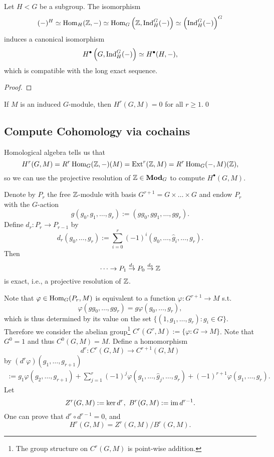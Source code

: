 \begin{proposition}\label{Shapiro's lemma}
Let $H < G$ be a subgroup.
The isomorphism\[(-)^H \simeq \operatorname{Hom}_H(\mathbb{Z}, -) \simeq \operatorname{Hom}_G\left(\mathbb{Z}, \operatorname{Ind}^G_H(-)\right)\simeq \left( \operatorname{Ind}_H^G(-) \right)^G\]induces a canonical isomorphism \[H^\bullet \left(G, \operatorname{Ind}^G_H (-)\right)\simeq H^\bullet (H, -),\]
which is compatible with the long exact sequence.
\end{proposition}
\begin{proof}
    
\end{proof}

\begin{corollary}\label{induced modules have trivial cohomology}
    If $M$ is an induced $G$-module, then $H^r(G, M) = 0$ for all $r\ge 1$.\qed
\end{corollary}


\subsection{Compute Cohomology via cochains}

Homological algebra tells us that \[H^r(G, M) = R^r\operatorname{Hom}_G(\mathbb{Z}, -)(M) = \operatorname{Ext}^r(\mathbb{Z}, M) = R^r\operatorname{Hom}_G(-, M)(\mathbb{Z}),\]
so we can use the projective resolution of $\mathbb{Z}\in\mathbf{Mod}_G$ to compute $H^\bullet(G, M)$.

Denote by $P_r$ the free $\mathbb{Z}$-module with basis $G^{r+1} = G\times\dots\times G$ and endow $P_r$ with the $G$-action
\[g(g_0, g_1,\dots, g_r) := (gg_0, gg_1, \dots, gg_r).\]
Define $d_r : P_r\to P_{r-1}$ by \[d_r(g_0, \dots, g_r) := \sum_{i=0}^r(-1)^i(g_0,\dots, \hat{g}_i, \dots, g_r).\]
Then \[\dots\to P_1\stackrel{d_1}{\to} P_0\stackrel{d_0}{\to} \mathbb{Z}\] is exact, i.e., a projective resolution of $\mathbb{Z}$.

Note that $\varphi\in\operatorname{Hom}_G(P_r, M)$ is equivalent to a function $\varphi : G^{r+1}\to M$ s.t. \[\varphi(gg_0, \dots, gg_r) = g\varphi(g_0, \dots, g_r),\]
which is thus determined by its value on the set $\{(1, g_1, \dots, g_r) : g_i\in G\}$. Therefore we consider the abelian group\footnote{The group structure on $C^r(G, M)$ is point-wise addition.} $C^r(G^r, M) := \{\varphi : G \to M\}$. Note that $G^0 = 1$ and thus $C^0(G, M) = M$.
Define a homomorphism \[d^r : C^r(G, M) \to C^{r+1}(G, M)\] by $(d^r\varphi)(g_1, \dots, g_{r+1})$\begin{align}
    := g_1\varphi(g_2, \dots, g_{r+1}) + \sum_{j=1}^r(-1)^j\varphi(g_1, \dots, \hat{g}_j, \dots, g_r) + (-1)^{r+1}\varphi(g_1, \dots, g_r).
\end{align}
Let \[Z^r(G, M) := \ker d^r,\ B^r(G, M) := \operatorname{im} d^{r-1}.\]
One can prove that $d^r\circ d^{r-1} = 0$, and \[H^r(G, M) = Z^r(G, M)/B^r(G, M).\]


